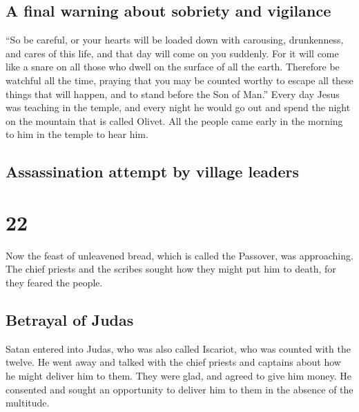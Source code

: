 \hypertarget{a-final-warning-about-sobriety-and-vigilance}{%
\subsection{A final warning about sobriety and
vigilance}\label{a-final-warning-about-sobriety-and-vigilance}}

 ``So be careful, or your hearts will be loaded down with
carousing, drunkenness, and cares of this life, and that day will come
on you suddenly.  For it will come like a snare on all
those who dwell on the surface of all the earth. 
Therefore be watchful all the time, praying that you may be counted
worthy to escape all these things that will happen, and to stand before
the Son of Man.''  Every day Jesus was teaching in the
temple, and every night he would go out and spend the night on the
mountain that is called Olivet.  All the people came
early in the morning to him in the temple to hear him.

\hypertarget{assassination-attempt-by-village-leaders}{%
\subsection{Assassination attempt by village
leaders}\label{assassination-attempt-by-village-leaders}}

\hypertarget{section-12}{%
\section{22}\label{section-12}}

 Now the feast of unleavened bread, which is called the
Passover, was approaching.  The chief priests and the
scribes sought how they might put him to death, for they feared the
people.

\hypertarget{betrayal-of-judas}{%
\subsection{Betrayal of Judas}\label{betrayal-of-judas}}

 Satan entered into Judas, who was also called Iscariot,
who was counted with the twelve.  He went away and talked
with the chief priests and captains about how he might deliver him to
them.  They were glad, and agreed to give him money.
 He consented and sought an opportunity to deliver him to
them in the absence of the multitude.

